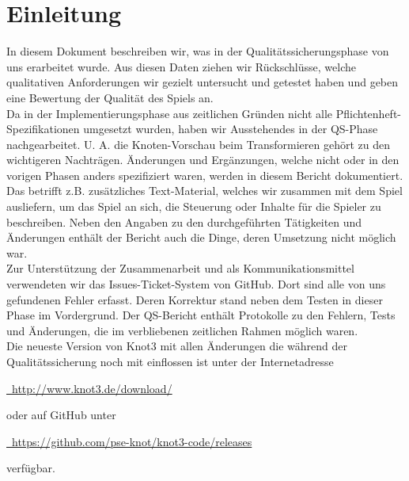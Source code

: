 %



\chapter{Einleitung}
\label{Kapitel:Einleitung}

In diesem Dokument beschreiben wir, was in der Qualitätssicherungsphase von uns erarbeitet wurde. Aus diesen Daten ziehen wir Rückschlüsse, welche qualitativen Anforderungen wir gezielt untersucht und getestet haben und geben eine Bewertung der Qualität des Spiels an.\\

Da in der Implementierungsphase aus zeitlichen Gründen nicht alle Pflichtenheft-Spezifikationen umgesetzt wurden, haben wir Ausstehendes in der QS-Phase nachgearbeitet. U. A. die Knoten-Vorschau beim Transformieren gehört zu den wichtigeren Nachträgen. Änderungen und Ergänzungen, welche nicht oder in den vorigen Phasen anders spezifiziert waren, werden in diesem Bericht dokumentiert. Das betrifft z.B. zusätzliches Text-Material, welches wir zusammen mit dem Spiel ausliefern, um das Spiel an sich, die Steuerung oder Inhalte für die Spieler zu beschreiben. Neben den Angaben zu den durchgeführten Tätigkeiten und Änderungen enthält der Bericht auch die Dinge, deren Umsetzung nicht möglich war.\\

Zur Unterstützung der Zusammenarbeit und als Kommunikationsmittel verwendeten wir das \glqq Issues\grqq-Ticket-System von GitHub. Dort sind alle von uns gefundenen Fehler erfasst. Deren Korrektur stand neben dem Testen in dieser Phase im Vordergrund. Der QS-Bericht enthält Protokolle zu den Fehlern, Tests und Änderungen, die im verbliebenen zeitlichen Rahmen möglich waren.\\

Die neueste Version von Knot3 mit allen Änderungen die während der Qualitätssicherung noch mit einflossen ist unter der Internetadresse\\

\begin{center}
\href{http://www.knot3.de/download/}{\mousecursor~http://www.knot3.de/download/}\\
\end{center}

oder auf GitHub unter\\

\begin{center}
\href{https://github.com/pse-knot/knot3-code/releases}{\mousecursor~https://github.com/pse-knot/knot3-code/releases}\\
\end{center}

verfügbar.



